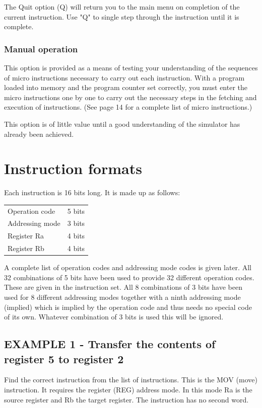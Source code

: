 \documentclass{article}
\begin{document}
The Quit option (Q) will return you to the main menu on completion of the current instruction. Use "Q" to single step through the instruction until it is complete.

\subsubsection{Manual operation}

This option is provided as a means of testing your understanding of the sequences of micro instructions necessary to carry out each instruction. With a program loaded into memory and the program counter set correctly, you must enter the micro instructions one by one to carry out the necessary steps in the fetching and execution of instructions. (See page 14 for a complete list of micro instructions.)

This option is of little value until a good understanding of the simulator has already been achieved.

\section{Instruction formats}

Each instruction is 16 bits long. It is made up as follows:

\begin{tabular}{ m{3cm} m{1cm} }
 Operation code & 5 bits \\ 
 Addressing mode & 3 bits \\  
 Register Ra & 4 bits \\
 Register Rb & 4 bits
\end{tabular}

A complete list of operation codes and addressing mode codes is given later. All 32 combinations of 5 bits have been used to provide 32 different operation codes. These are given in the instruction set. All 8 combinations of 3 bits have been used for 8 different addressing modes together with a ninth addressing mode (implied) which is implied by the operation code and thus needs no special code of its own. Whatever combination of 3 bits is used this will be ignored.

\subsection{EXAMPLE 1 - Transfer the contents of register 5 to register 2}

Find the correct instruction from the list of instructions. This is the MOV (move) instruction. It requires the register (REG) address mode. In this mode Ra is the source register and Rb the target register. The instruction has no second word.
\end{document}
